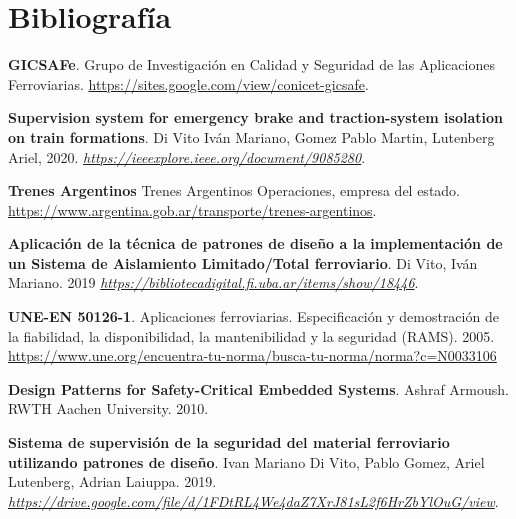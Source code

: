 
\section{Bibliografía}



 \begin{thebibliography}{30}

 \textbf{GICSAFe}. Grupo de Investigación en Calidad y Seguridad de las Aplicaciones Ferroviarias. \href{https://sites.google.com/view/conicet-gicsafe}{https://sites.google.com/view/conicet-gicsafe}.

 
 \textbf{Supervision system for emergency brake and traction-system isolation on train formations}. Di Vito Iván Mariano, Gomez Pablo Martin, Lutenberg Ariel, 2020. \href{https://ieeexplore.ieee.org/document/9085280}{\textit{https://ieeexplore.ieee.org/document/9085280}}.


 \textbf{Trenes Argentinos} Trenes Argentinos Operaciones, empresa del estado. \href{https://www.argentina.gob.ar/transporte/trenes-argentinos}{https://www.argentina.gob.ar/transporte/trenes-argentinos}.


 \textbf{Aplicación de la técnica de patrones de diseño a la implementación de un Sistema de Aislamiento Limitado/Total ferroviario}. Di Vito, Iván Mariano. 2019 \href{https://bibliotecadigital.fi.uba.ar/items/show/18446}{\textit{https://bibliotecadigital.fi.uba.ar/items/show/18446}}.

 


\textbf{UNE-EN 50126-1}. Aplicaciones ferroviarias. Especificación y demostración de la fiabilidad, la disponibilidad, la mantenibilidad y la seguridad (RAMS). 2005. \href{https://www.une.org/encuentra-tu-norma/busca-tu-norma/norma?c=N0033106}{https://www.une.org/encuentra-tu-norma/busca-tu-norma/norma?c=N0033106}


 \textbf{Design Patterns for Safety-Critical Embedded Systems}. Ashraf Armoush. RWTH Aachen University. 2010.



 \textbf{Sistema de supervisión de la seguridad del material ferroviario utilizando patrones de diseño}. Ivan Mariano Di Vito, Pablo Gomez, Ariel Lutenberg, Adrian Laiuppa. 2019. \href{https://drive.google.com/file/d/1FDtRL4We4daZ7XrJ81sL2f6HrZbYlOuG/view}{\textit{https://drive.google.com/file/d/1FDtRL4We4daZ7XrJ81sL2f6HrZbYlOuG/view}}. 





\end{thebibliography}
